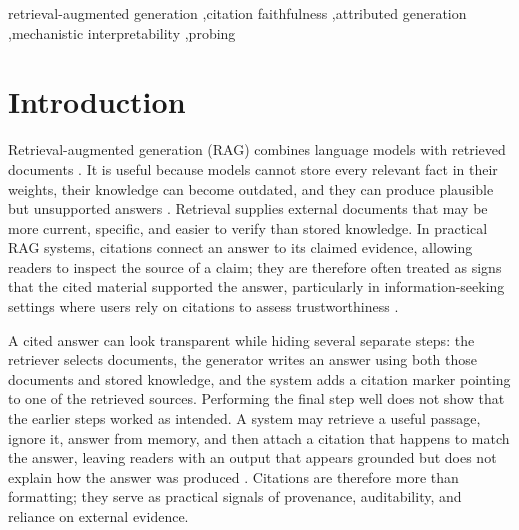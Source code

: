 \documentclass[a4paper,fleqn]{cas-sc}
\begin{document}
\begin{keywords}
retrieval-augmented generation \sep citation faithfulness \sep attributed generation \sep mechanistic interpretability \sep probing
\end{keywords}

\maketitle

\section{Introduction}
\label{sec:introduction}

Retrieval-augmented generation (RAG) combines language models with retrieved documents \cite{lewis2020rag,guu2020realm,izacard2021fid}. It is useful because models cannot store every relevant fact in their weights, their knowledge can become outdated, and they can produce plausible but unsupported answers \cite{mallen2023popqa,ji2023hallucination}. Retrieval supplies external documents that may be more current, specific, and easier to verify than stored knowledge. In practical RAG systems, citations connect an answer to its claimed evidence, allowing readers to inspect the source of a claim; they are therefore often treated as signs that the cited material supported the answer, particularly in information-seeking settings where users rely on citations to assess trustworthiness \cite{liu2023verifiability}.

A cited answer can look transparent while hiding several separate steps: the retriever selects documents, the generator writes an answer using both those documents and stored knowledge, and the system adds a citation marker pointing to one of the retrieved sources. Performing the final step well does not show that the earlier steps worked as intended. A system may retrieve a useful passage, ignore it, answer from memory, and then attach a citation that happens to match the answer, leaving readers with an output that appears grounded but does not explain how the answer was produced \cite{wallat2025correctness}. Citations are therefore more than formatting; they serve as practical signals of provenance, auditability, and reliance on external evidence.
\end{document}
